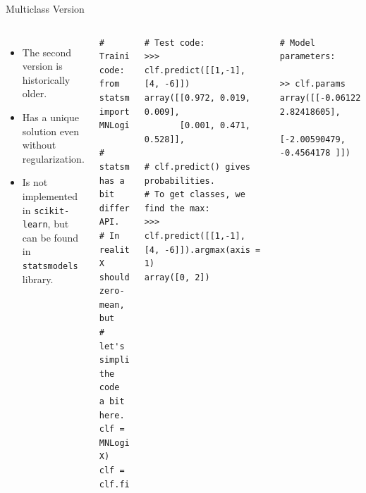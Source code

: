 \documentclass[10pt, aspectratio=169]{beamer} %
\begin{document}
\begin{frame}[fragile]{Multiclass Version }
\begin{columns}[onlytextwidth]
\begin{itemize}
	\item The second version is historically older.
	\item Has a unique solution even without regularization.
	\item Is not implemented in \texttt{scikit-learn}, but can be found in \texttt{statsmodels} library.
\end{itemize}
\begin{lstlisting}
# Training code:
from statsmodels.api import MNLogit

# statsmodel has a bit different API.
# In reality, X should zero-mean, but
# let's simplify the code a bit here.
clf = MNLogit(y, X)
clf = clf.fit()
\end{lstlisting}
\vspace*{-0.3cm}
\begin{columns}[onlytextwidth]
\begin{lstlisting}
# Test code:
>>> clf.predict([[1,-1], [4, -6]])
array([[0.972, 0.019, 0.009],
       [0.001, 0.471, 0.528]],

# clf.predict() gives probabilities.
# To get classes, we find the max:
>>>  clf.predict([[1,-1], [4, -6]]).argmax(axis = 1)
array([0, 2])
\end{lstlisting}
\begin{lstlisting}
# Model parameters:

>> clf.params
array([[-0.06122776,  2.82418605],
       [-2.00590479, -0.4564178 ]])


\end{lstlisting}
\end{columns}
\end{columns}
\end{frame}
\end{document}
